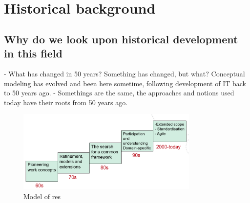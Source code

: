 \section{Historical background}

\subsection{Why do we look upon historical development in this field}
- What has changed in 50 years? Something has changed, but what? Conceptual modeling has evolved and been here sometime, following development of IT back to 50 years ago.
- Somethings are the same, the approaches and notions used today have their roots from 50 years ago.

\begin{figure}
	\centering
	\includegraphics[width=0.8\textwidth]{images/modellingfivedecades.png}
	\caption{Model of res}
	\label{fig:modellingFiveDecades}
\end{figure}

